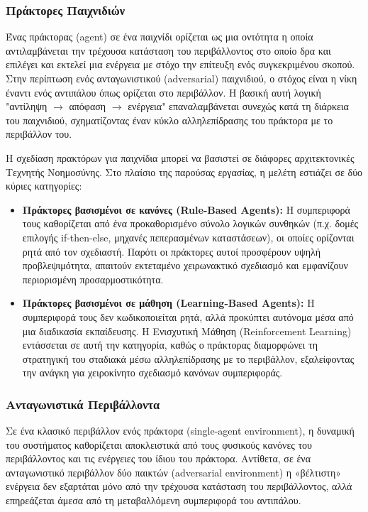 \documentclass[12pt]{article}
\begin{document}
\subsubsection{Πράκτορες Παιχνιδιών}
Ένας πράκτορας (agent) σε ένα παιχνίδι ορίζεται ως μια οντότητα η οποία αντιλαμβάνεται την τρέχουσα κατάσταση του περιβάλλοντος στο οποίο δρα και επιλέγει και εκτελεί μια ενέργεια με στόχο την επίτευξη ενός συγκεκριμένου σκοπού. Στην περίπτωση ενός ανταγωνιστικού (adversarial) παιχνιδιού, ο στόχος είναι η νίκη έναντι ενός αντιπάλου όπως ορίζεται στο περιβάλλον. Η βασική αυτή λογική "αντίληψη $\rightarrow$ απόφαση $\rightarrow$ ενέργεια" επαναλαμβάνεται συνεχώς κατά τη διάρκεια του παιχνιδιού, σχηματίζοντας έναν κύκλο αλληλεπίδρασης του πράκτορα με το περιβάλλον του.

Η σχεδίαση πρακτόρων για παιχνίδια μπορεί να βασιστεί σε διάφορες αρχιτεκτονικές Τεχνητής Νοημοσύνης. Στο πλαίσιο της παρούσας εργασίας, η μελέτη εστιάζει σε δύο κύριες κατηγορίες:

\begin{itemize}
    \item \textbf{Πράκτορες βασισμένοι σε κανόνες (Rule-Based Agents):} 
    Η συμπεριφορά τους καθορίζεται από ένα προκαθορισμένο σύνολο λογικών συνθηκών (π.χ. δομές επιλογής if-then-else, μηχανές πεπερασμένων καταστάσεων), οι οποίες ορίζονται ρητά από τον σχεδιαστή. Παρότι οι πράκτορες αυτοί προσφέρουν υψηλή προβλεψιμότητα, απαιτούν εκτεταμένο χειρωνακτικό σχεδιασμό και εμφανίζουν περιορισμένη προσαρμοστικότητα.
    
    \item \textbf{Πράκτορες βασισμένοι σε μάθηση (Learning-Based Agents):} 
    Η συμπεριφορά τους δεν κωδικοποιείται ρητά, αλλά προκύπτει αυτόνομα μέσα από μια διαδικασία εκπαίδευσης. Η Ενισχυτική Μάθηση (Reinforcement Learning) εντάσσεται σε αυτή την κατηγορία, καθώς ο πράκτορας διαμορφώνει τη στρατηγική του σταδιακά μέσω αλληλεπίδρασης με το περιβάλλον, εξαλείφοντας την ανάγκη για χειροκίνητο σχεδιασμό κανόνων συμπεριφοράς.
\end{itemize}

\subsubsection{Ανταγωνιστικά Περιβάλλοντα}

Σε ένα κλασικό περιβάλλον ενός πράκτορα (single-agent environment), η δυναμική του συστήματος καθορίζεται αποκλειστικά από τους φυσικούς κανόνες του περιβάλλοντος και τις ενέργειες του ίδιου του πράκτορα. Αντίθετα, σε ένα ανταγωνιστικό περιβάλλον δύο παικτών (adversarial environment) η «βέλτιστη» ενέργεια δεν εξαρτάται μόνο από την τρέχουσα κατάσταση του περιβάλλοντος, αλλά επηρεάζεται άμεσα από τη μεταβαλλόμενη συμπεριφορά του αντιπάλου.
\end{document}
